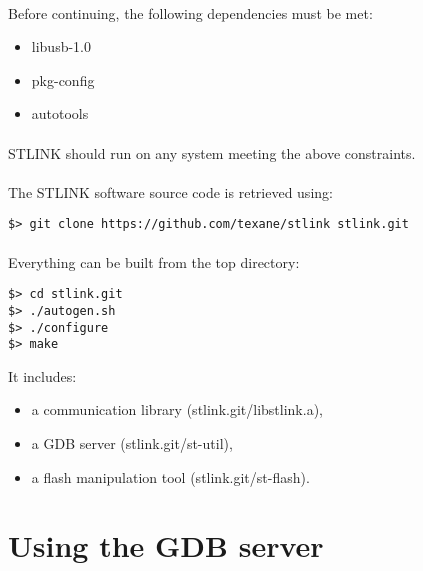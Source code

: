 \documentclass[a4paper, 11pt]{article}
\begin{document}
\paragraph{}
Before continuing, the following dependencies must be met:
\begin{itemize}
\item libusb-1.0
\item pkg-config
\item autotools
\end{itemize}

\paragraph{}
STLINK should run on any system meeting the above constraints.

\paragraph{}
The STLINK software source code is retrieved using:\\
\begin{small}
\begin{lstlisting}[frame=tb]
$> git clone https://github.com/texane/stlink stlink.git
\end{lstlisting}
\end{small}

\paragraph{}
Everything can be built from the top directory:\\
\begin{small}
\begin{lstlisting}[frame=tb]
$> cd stlink.git
$> ./autogen.sh 
$> ./configure
$> make
\end{lstlisting}
\end{small}
It includes:
\begin{itemize}
\item a communication library (stlink.git/libstlink.a),
\item a GDB server (stlink.git/st-util),
\item a flash manipulation tool (stlink.git/st-flash).
\end{itemize}


\newpage
\section{Using the GDB server}
\end{document}
